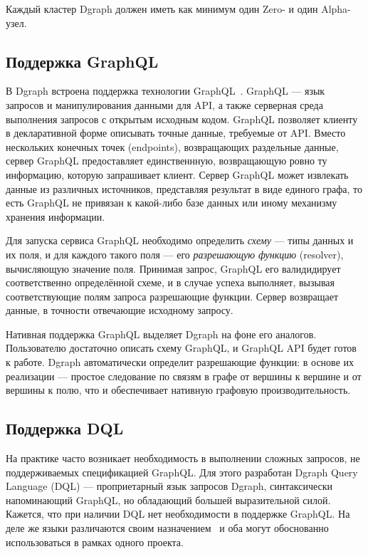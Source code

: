Каждый кластер Dgraph должен иметь как минимум один Zero- и один Alpha-узел.

\subsection{Поддержка GraphQL}

В Dgraph встроена поддержка технологии GraphQL~\cite{graphql}. GraphQL --- язык запросов и
манипулирования данными для API, а также серверная среда выполнения запросов с открытым исходным
кодом. GraphQL позволяет клиенту в декларативной форме описывать точные данные, требуемые от API.
Вместо нескольких конечных точек (endpoints), возвращающих раздельные данные, сервер GraphQL
предоставляет единственнную, возвращающую ровно ту информацию, которую запрашивает клиент. Сервер
GraphQL может извлекать данные из различных источников, представляя результат в виде единого графа,
то есть GraphQL не привязан к какой-либо базе данных или иному механизму хранения информации.

Для запуска сервиса GraphQL необходимо определить \textit{схему} --- типы данных и их поля, и для
каждого такого поля --- его \textit{разрешающую функцию} (resolver), вычисляющую значение поля.
Принимая запрос, GraphQL его валидидирует соответственно определённой схеме, и в случае успеха
выполняет, вызывая соответствующие полям запроса разрешающие функции. Сервер возвращает данные, в
точности отвечающие исходному запросу.

Нативная поддержка GraphQL выделяет Dgraph на фоне его аналогов. Пользователю достаточно описать
схему GraphQL, и GraphQL API будет готов к работе. Dgraph автоматически определит разрешающие
функции: в основе их реализации --- простое следование по связям в графе от вершины к вершине и от
вершины к полю, что и обеспечивает нативную графовую производительность.

\subsection{Поддержка DQL}

На практике часто возникает необходимость в выполнении сложных запросов, не поддерживаемых
спецификацией GraphQL. Для этого разработан Dgraph Query Language (DQL) --- проприетарный язык
запросов Dgraph, синтаксически напоминающий GraphQL, но обладающий большей выразительной силой.
Кажется, что при наличии DQL нет необходимости в поддержке GraphQL. На деле же языки различаются
своим назначением~\cite{graphqlVsDql} и оба могут обоснованно использоваться в рамках одного
проекта.

